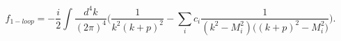 \begin{equation}
f_{1-loop} = -\frac{i}{2}
\int \frac{d^4k}{(2\pi)^4} \Bigg(\frac{1}{k^2 (k+p)^2}
- \sum\limits_i c_i\frac{1}{(k^2-M_i^2)\Big((k+p)^2-M_i^2\Big)}\Bigg).
\end{equation}

